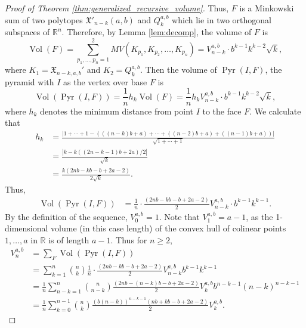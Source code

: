 \documentclass[11pt]{amsart}
\theoremstyle{definition}
\newcommand{\0}{\emptyset}
\newcommand{\R}{\mathbb{R}}
\newcommand{\X}{\mathfrak{X}}
\DeclareMathOperator{\Vol}{Vol}
\DeclareMathOperator{\Pyr}{Pyr}
\begin{document}
\begin{proof}[Proof of Theorem \ref{thm:generalized_recursive_volume}]
Thus, $F$ is a Minkowski sum of two polytopes $\X'_{n-k}(a,b)$ and $Q^{a,b}_k$ which lie in two orthogonal subspaces of $\R^n$. 
Therefore, by Lemma \ref{lem:decomp}, the volume of $F$ is
\[ \Vol(F) = \sum_{p_1, \ldots, p_n = 1}^2 MV(K_{p_1}, K_{p_2}, \ldots, K_{p_n}) = V^{a,b}_{n-k} \cdot b^{k-1}k^{k-2} \sqrt{k},\]
where $K_1 = \X_{n-k,a,b}'$ and $K_2 = Q^{a,b}_k$. 
Then the volume of $\Pyr(I,F)$, the pyramid with $I$ as the vertex over base $F$ is
\[ \Vol(\Pyr(I,F)) = \frac{1}{n}h_k\Vol(F) = \frac{1}{n}h_k V^{a,b}_{n-k} \cdot b^{k-1}k^{k-2} \sqrt{k},\]
where $h_k$ denotes the minimum distance from point $I$ to the face $F$.
We calculate that
\begin{align*}
    h_k &= \frac{|1+ \cdots + 1 -(((n-k)b+a) + \cdots + ((n-2)b + a) + ((n-1)b+a))|}{\sqrt{1+\cdots +1}}\\
    &= \frac{|k - k((2n-k-1)b+2a)/2|}{\sqrt{k}}\\
    &= \frac{k(2nb-kb-b+2a-2)}{2\sqrt{k}}.
\end{align*} 
Thus, 
\begin{align*}
    \Vol(\Pyr(I,F))
    &=\frac{1}{n}\cdot \frac{(2nb-kb-b+2a-2)}{2}V^{a,b}_{n-k} \cdot b^{k-1}k^{k-1}.
\end{align*}
By the definition of the sequence, $V^{a,b}_0=1$.
Note that $V^{a,b}_1 = a-1$, as the 1-dimensional volume (in this case length) of the convex hull of colinear points $1, \ldots, a$ in $\R$ is of length $a-1$. Thus for $n \geq 2$,
\begin{align*}
    V^{a,b}_n &= \sum_{F}\Vol(\Pyr(I,F))\\
    &= \sum_{k=1}^{n}\binom{n}{k}\frac{1}{n}\cdot \frac{(2nb-kb-b+2a-2)}{2}V^{a,b}_{n-k} b^{k-1}k^{k-1}\\
    &= \frac{1}{n}\sum_{n-k=1}^{n}\binom{n}{n-k} \frac{(2nb-(n-k)b-b+2a-2)}{2}V^{a,b}_{k} b^{n-k-1}(n-k)^{n-k-1}\\
    &= \frac{1}{n}\sum_{k=0}^{n-1}\binom{n}{k} \frac{(b(n-k))^{n-k-1}(nb+kb-b+2a-2)}{2}V^{a,b}_{k}.
\end{align*}
\end{proof}
\end{document}
